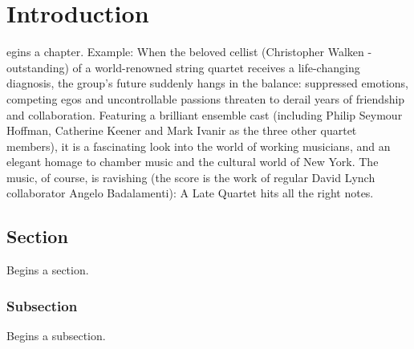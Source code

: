 %
%
\let\textcircled=\pgftextcircled
\chapter{Introduction}
\label{chap:intro}

egins a chapter. Example: When the beloved cellist (Christopher Walken - outstanding) of a world-renowned string quartet receives a life-changing diagnosis, the group's future suddenly hangs in the balance: suppressed emotions, competing egos and uncontrollable passions threaten to derail years of friendship and collaboration. Featuring a brilliant ensemble cast (including Philip Seymour Hoffman, Catherine Keener and Mark Ivanir as the three other quartet members), it is a fascinating look into the world of working musicians, and an elegant homage to chamber music and the cultural world of New York. The music, of course, is ravishing (the score is the work of regular David Lynch collaborator Angelo Badalamenti): A Late Quartet hits all the right notes.

\section{Section}
\label{sec:sec01}

Begins a section.

\subsection{Subsection}
\label{subsec:subsec01}

Begins a subsection.

